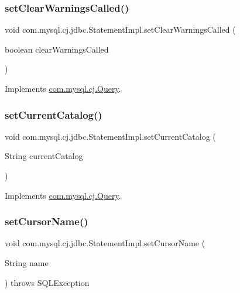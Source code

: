 \subsubsection{\texorpdfstring{set\+Clear\+Warnings\+Called()}{setClearWarningsCalled()}}
{\footnotesize\ttfamily void com.\+mysql.\+cj.\+jdbc.\+Statement\+Impl.\+set\+Clear\+Warnings\+Called (\begin{DoxyParamCaption}\item[{boolean}]{clear\+Warnings\+Called }\end{DoxyParamCaption})}



Implements \mbox{\hyperlink{interfacecom_1_1mysql_1_1cj_1_1_query_a7ee7a059fdd6b703d9def2d3bd77a52f}{com.\+mysql.\+cj.\+Query}}.

\mbox{\label{classcom_1_1mysql_1_1cj_1_1jdbc_1_1_statement_impl_a30dda4ad8c6bc0be8eb3c926c9a1e0f1}} 
\subsubsection{\texorpdfstring{set\+Current\+Catalog()}{setCurrentCatalog()}}
{\footnotesize\ttfamily void com.\+mysql.\+cj.\+jdbc.\+Statement\+Impl.\+set\+Current\+Catalog (\begin{DoxyParamCaption}\item[{String}]{current\+Catalog }\end{DoxyParamCaption})}



Implements \mbox{\hyperlink{interfacecom_1_1mysql_1_1cj_1_1_query_a456b19ab936c8d8ecd49dc23aaf6a833}{com.\+mysql.\+cj.\+Query}}.

\mbox{\label{classcom_1_1mysql_1_1cj_1_1jdbc_1_1_statement_impl_a60cd7b41aa7098febdb3f9af3aa40423}} 
\subsubsection{\texorpdfstring{set\+Cursor\+Name()}{setCursorName()}}
{\footnotesize\ttfamily void com.\+mysql.\+cj.\+jdbc.\+Statement\+Impl.\+set\+Cursor\+Name (\begin{DoxyParamCaption}\item[{String}]{name }\end{DoxyParamCaption}) throws S\+Q\+L\+Exception}

